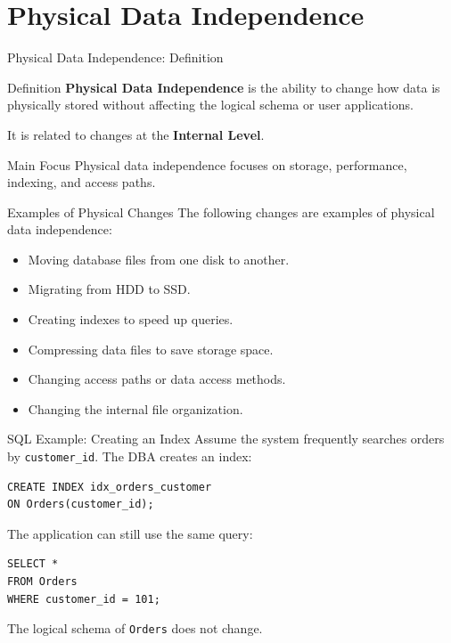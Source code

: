 \documentclass[aspectratio=169,11pt]{beamer}
\begin{document}
\section{Physical Data Independence}

\begin{frame}{Physical Data Independence: Definition}
\begin{block}{Definition}
\textbf{Physical Data Independence} is the ability to change how data is physically stored without affecting the logical schema or user applications.
\end{block}

\vspace{0.3cm}
It is related to changes at the \textbf{Internal Level}.

\vspace{0.3cm}
\begin{alertblock}{Main Focus}
Physical data independence focuses on storage, performance, indexing, and access paths.
\end{alertblock}
\end{frame}

\begin{frame}{Examples of Physical Changes}
The following changes are examples of physical data independence:
\begin{itemize}
  \item Moving database files from one disk to another.
  \item Migrating from HDD to SSD.
  \item Creating indexes to speed up queries.
  \item Compressing data files to save storage space.
  \item Changing access paths or data access methods.
  \item Changing the internal file organization.
\end{itemize}
\end{frame}

\begin{frame}[fragile]{SQL Example: Creating an Index}
Assume the system frequently searches orders by \texttt{customer\_id}. The DBA creates an index:

\begin{lstlisting}[style=sqlstyle]
CREATE INDEX idx_orders_customer
ON Orders(customer_id);
\end{lstlisting}

The application can still use the same query:

\begin{lstlisting}[style=sqlstyle]
SELECT *
FROM Orders
WHERE customer_id = 101;
\end{lstlisting}

The logical schema of \texttt{Orders} does not change.
\end{frame}
\end{document}
